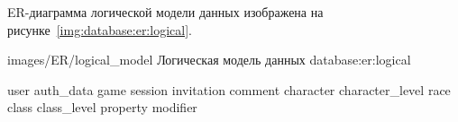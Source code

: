ER-диаграмма логической модели данных изображена на рисунке~\ref{img:database:er:logical}.

            {images/ER/logical_model}
            {Логическая модель данных}
            {database:er:logical}

{user}
{auth_data}
{game}
{session}
{invitation}
{comment}
{character}
{character_level}
{race}
{class}
{class_level}
{property}
{modifier}

\emptyString

